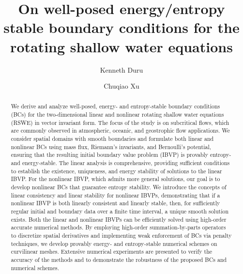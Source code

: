 \documentclass{article}
\title{On well-posed energy/entropy stable  boundary conditions for the  rotating shallow water equations}
\author[1]{Kenneth Duru}
\author[2,3]{Chuqiao Xu}
\affil[1]{Department of Mathematical Sciences, University of Texas at El Paso, USA}
\affil[2]{Mathematical Sciences Institute, Australian National University, Canberra, Australia}
\affil[3]{School of Mathematics, Shandong University, Jinan, China}
\date{}
\numberwithin{equation}{section}
\theoremstyle{definition}
\begin{document}
\maketitle

\begin{abstract}

We derive and analyze well-posed, energy- and entropy-stable boundary conditions (BCs) for the two-dimensional linear and nonlinear rotating shallow water equations (RSWE) in vector invariant form. The focus of the study is on subcritical flows, which are commonly observed in atmospheric, oceanic, and geostrophic flow applications. We consider spatial domains with smooth boundaries and formulate both linear and nonlinear BCs using mass flux, Riemann's invariants, and Bernoulli’s potential, ensuring that the resulting initial boundary value problem (IBVP) is provably entropy- and energy-stable.
%
The linear analysis is comprehensive, providing sufficient conditions to establish the existence, uniqueness, and energy stability of solutions to the linear IBVP. For the nonlinear IBVP, which admits more general solutions, our goal is to develop nonlinear BCs that guarantee entropy stability. We introduce the concepts of linear consistency and linear stability for nonlinear IBVPs, demonstrating that if a nonlinear IBVP is both linearly consistent and linearly stable, then, for sufficiently regular initial and boundary data over a finite time interval, a unique smooth solution exists.
%
Both the linear and nonlinear IBVPs can be efficiently solved using high-order accurate numerical methods. By employing high-order summation-by-parts operators to discretize spatial derivatives and implementing weak enforcement of BCs via penalty techniques, we develop provably energy- and entropy-stable numerical schemes on curvilinear meshes. Extensive numerical experiments are presented to verify the accuracy of the methods and to demonstrate the robustness of the proposed BCs and numerical schemes.
\end{abstract}

\end{document}
